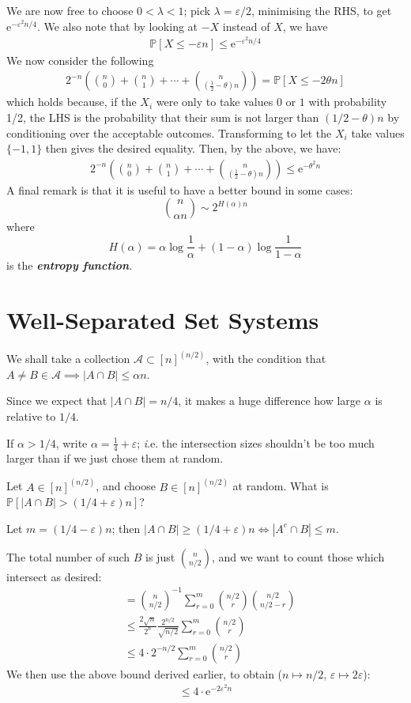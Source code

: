 \documentclass[]{article}
\theoremstyle{custhm}
\theoremstyle{cusdef}
\theoremstyle{custhm}
\theoremstyle{custhm}
\theoremstyle{custhm}
\theoremstyle{custhm}
\theoremstyle{cusdef}
\theoremstyle{remark}
\theoremstyle{custhm}
\newcommand{\e}{\mathrm{e}}
\newcommand{\eps}{\varepsilon}
\renewcommand{\P}{\mathbb{P}}
\newcommand{\undf}[1]{\textit{\textbf{#1}}}
\renewcommand{\it}[1]{\textit{#1}}
\newcommand{\A}{\mathcal{A}}
\begin{document}
We are now free to choose $0 < \lambda < 1$; pick $\lambda = \eps/2$, minimising the RHS, to get $\e^{-\eps^2 n/4}$. We also note that by looking at $-X$ instead of $X$, we have
\begin{align*}
\P[X\le -\eps n] \le \e^{-\eps^2n/4}
\end{align*}
We now consider the following
\begin{align*}
2^{-n}\left(\binom{n}{0} +\binom{n}{1}+\cdots+\binom{n}{\left(\frac{1}{2}-\theta\right)n}\right) = \P[X \le -2\theta n]
\end{align*}
which holds because, if the $X_i$ were only to take values $0$ or $1$ with probability 1/2, the LHS is the probability that their sum  is not larger than $(1/2 - \theta)n$ by conditioning over the acceptable outcomes. Transforming to let the $X_i$ take values $\{-1,1\}$ then gives the desired equality. Then, by the above, we have:
\begin{align*}
2^{-n}\left(\binom{n}{0} +\binom{n}{1}+\cdots+\binom{n}{\left(\frac{1}{2}-\theta\right)n}\right) \le \e^{-\theta^2 n}
\end{align*}
A final remark is that it is useful to have a better bound in some cases:
\[
\binom{n}{\alpha n} \sim 2^{H(\alpha)n}
\]
where
\[
H(\alpha) = \alpha \log \frac{1}{\alpha} + (1-\alpha)\log \frac{1}{1-\alpha}
\]
is the \undf{entropy function}.

\section{Well-Separated Set Systems}

We shall take a collection $\A\subset [n]^{(n/2)}$, with the condition that $A\ne B\in \A\implies |A\cap B|\le \alpha n$.

Since we expect that $|A\cap B| = n/4$, it makes a huge difference how large $\alpha$ is relative to $1/4$.

If $\alpha > 1/4$, write $\alpha = \frac{1}{4}+\eps$; {\it i.e.} the intersection sizes shouldn't be too much larger than if we just chose them at random.

Let $A \in [n]^{(n/2)}$, and choose $B\in [n]^{(n/2)}$ at random. What is $\P[|A\cap B| >(1/4+\eps)n]$?

Let $m = (1/4 - \eps)n$; then $|A\cap B| \ge (1/4 + \eps)n \iff |A^c\cap B| \le m$.

The total number of such $B$ is just $\binom{n}{n/2}$, and we want to count those which intersect as desired:
\begin{align*}
 &=\binom{n}{n/2}^{-1}\sum_{r=0}^{m}\binom{n/2}{r}\binom{n/2}{n/2-r}\\
 &\le \frac{2\sqrt{n}}{2^n}\frac{2^{n/2}}{\sqrt{n/2}}\sum_{r=0}^{m}\binom{n/2}{r}\\
 &\le 4 \cdot 2^{-n/2}\sum_{r=0}^{m}\binom{n/2}{r}
\end{align*}
We then use the above bound derived earlier, to obtain ($n\mapsto n/2$, $\eps \mapsto 2\eps$):
\begin{align*}
\le 4\cdot \e^{-2\eps^2 n}
\end{align*}
\end{document}
